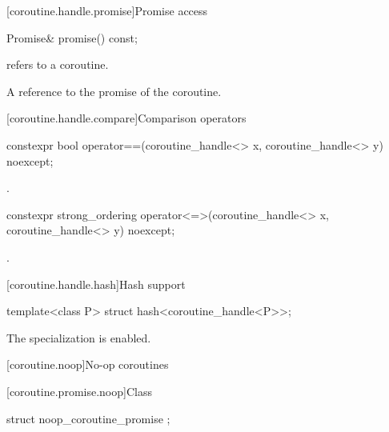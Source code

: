 [coroutine.handle.promise]{Promise access}

%
\begin{itemdecl}
Promise& promise() const;
\end{itemdecl}

\begin{itemdescr}
\pnum
\expects
{} refers to a coroutine.

\pnum
\returns
A reference to the promise of the coroutine.
\end{itemdescr}

[coroutine.handle.compare]{Comparison operators}

%
%
\begin{itemdecl}
constexpr bool operator==(coroutine_handle<> x, coroutine_handle<> y) noexcept;
\end{itemdecl}

\begin{itemdescr}
\pnum
\returns
{}.
\end{itemdescr}

%
\begin{itemdecl}
constexpr strong_ordering operator<=>(coroutine_handle<> x, coroutine_handle<> y) noexcept;
\end{itemdecl}

\begin{itemdescr}
\pnum
\returns
{}.
\end{itemdescr}

[coroutine.handle.hash]{Hash support}

%
\begin{itemdecl}
template<class P> struct hash<coroutine_handle<P>>;
\end{itemdecl}

\begin{itemdescr}
\pnum
The specialization is enabled.
\end{itemdescr}

[coroutine.noop]{No-op coroutines}

[coroutine.promise.noop]{Class }

%
\begin{itemdecl}
struct noop_coroutine_promise {};
\end{itemdecl}

